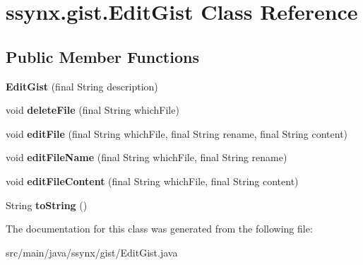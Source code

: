\hypertarget{classssynx_1_1gist_1_1EditGist}{}\section{ssynx.\+gist.\+Edit\+Gist Class Reference}
\label{classssynx_1_1gist_1_1EditGist}
\subsection*{Public Member Functions}
\begin{DoxyCompactItemize}
\item 
\mbox{\label{classssynx_1_1gist_1_1EditGist_a27a703d0313a86ab5579f4c5f7f8bc30}} 
{\bfseries Edit\+Gist} (final String description)
\item 
\mbox{\label{classssynx_1_1gist_1_1EditGist_a910e3001f104dab010fa07175eb56c61}} 
void {\bfseries delete\+File} (final String which\+File)
\item 
\mbox{\label{classssynx_1_1gist_1_1EditGist_aeab43afdeec1d073611dc5d7366a3040}} 
void {\bfseries edit\+File} (final String which\+File, final String rename, final String content)
\item 
\mbox{\label{classssynx_1_1gist_1_1EditGist_a7f8039030b378ea18fc94bc14fcbbda6}} 
void {\bfseries edit\+File\+Name} (final String which\+File, final String rename)
\item 
\mbox{\label{classssynx_1_1gist_1_1EditGist_a10bb7b9780738819fe3130a7fc7cdf31}} 
void {\bfseries edit\+File\+Content} (final String which\+File, final String content)
\item 
\mbox{\label{classssynx_1_1gist_1_1EditGist_aea1371f729316fc6e16f7601fb74d5c0}} 
String {\bfseries to\+String} ()
\end{DoxyCompactItemize}


The documentation for this class was generated from the following file\+:\begin{DoxyCompactItemize}
\item 
src/main/java/ssynx/gist/Edit\+Gist.\+java\end{DoxyCompactItemize}
